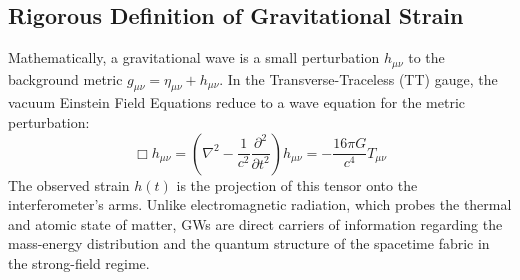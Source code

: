 \documentclass[11pt,a4paper,spanish]{book}
\numberwithin{equation}{chapter}
\numberwithin{figure}{chapter}
\numberwithin{equation}{chapter}
\numberwithin{figure}{chapter}
\numberwithin{table}{chapter}
\begin{document}
\begin{table}[h]
\centering
\caption{The 10 most significant gravitational-wave events from the GWTC catalogs.}
\label{tab:gwtc3}
\end{table}

\subsection{Rigorous Definition of Gravitational Strain}

Mathematically, a gravitational wave is a small perturbation $h_{\mu\nu}$ to the background metric $g_{\mu\nu} = \eta_{\mu\nu} + h_{\mu\nu}$. In the Transverse-Traceless (TT) gauge, the vacuum Einstein Field Equations reduce to a wave equation for the metric perturbation:
\begin{equation}
    \Box h_{\mu\nu} = \left( \nabla^2 - \frac{1}{c^2} \frac{\partial^2}{\partial t^2} \right) h_{\mu\nu} = -\frac{16\pi G}{c^4} T_{\mu\nu}
\end{equation}
The observed strain $h(t)$ is the projection of this tensor onto the interferometer's arms. Unlike electromagnetic radiation, which probes the thermal and atomic state of matter, GWs are direct carriers of information regarding the mass-energy distribution and the quantum structure of the spacetime fabric in the strong-field regime.
\end{document}
